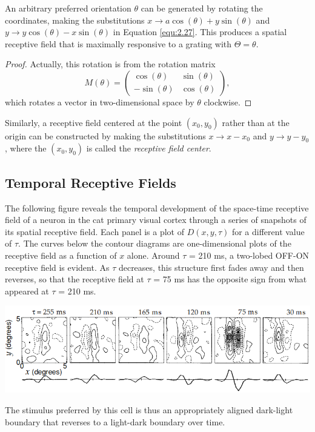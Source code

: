 \begin{prop}
  An arbitrary preferred orientation $\theta$ can be generated by rotating the coordinates, making the substitutions $x \to a\cos(\theta)+y\sin(\theta)$ and $y \to y\cos(\theta)-x\sin(\theta)$ in Equation \ref{equ:2.27}. This produces a spatial receptive field that is maximally responsive to a grating with $\Theta = \theta$.
\end{prop}
\begin{proof}
  Actually, this rotation is from the rotation matrix
  \begin{displaymath}
    M(\theta) = \left(
      \begin{matrix}
        \cos(\theta) & \sin(\theta)\\
        -\sin(\theta) & \cos(\theta)
      \end{matrix}
    \right),
  \end{displaymath}
  which rotates a vector in two-dimensional space by $\theta$ clockwise.
\end{proof}

\begin{prop}
  Similarly, a receptive field centered at the point $(x_0, y_0)$ rather than at the origin can be constructed by making the substitutions $x \to x-x_0$ and $y \to y-y_0$, where the $(x_0, y_0)$ is called the \emph{receptive field center}.
\end{prop}

\subsection{Temporal Receptive Fields}
\label{sec:TemporalReceptiveFields}

\begin{exm}
  \label{exm:TimeDevelopExm}
  The following figure reveals the temporal development of the space-time receptive field of a neuron in the cat primary visual cortex through a series of snapshots of its spatial receptive field.
  Each panel is a plot of $D(x, y,\tau)$ for a different value of $\tau$. The curves below the contour diagrams are one-dimensional plots of the receptive field as a function of $x$ alone. Around $\tau$ = 210 ms, a two-lobed OFF-ON receptive field is evident. As $\tau$ decreases, this structure first fades away and then reverses, so that the receptive field at $\tau$ = 75 ms has the opposite sign from what appeared at $\tau$ = 210 ms.
  \begin{center}
    \includegraphics[scale=0.3]{./png/timeDevelopExm}
  \end{center}
  The stimulus preferred by this cell is thus an appropriately aligned
dark-light boundary that reverses to a light-dark boundary over time.
\end{exm}

